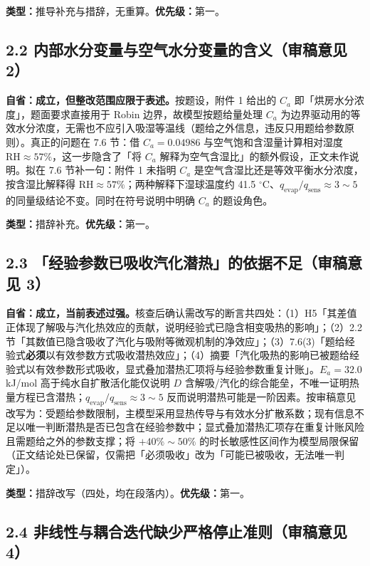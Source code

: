 \documentclass[12pt,a4paper]{ctexart}
\begin{document}
\textbf{类型：}推导补充与措辞，无重算。\textbf{优先级：}第一。

\subsection{2.2 内部水分变量与空气水分变量的含义（审稿意见 2）}

\textbf{自省：成立，但整改范围应限于表述。}按题设，附件 1 给出的 $C_a$ 即「烘房水分浓度」，题面要求直接用于 Robin 边界，故模型按题给量处理 $C_a$ 为边界驱动用的等效水分浓度，无需也不应引入吸湿等温线（题给之外信息，违反只用题给参数原则）。真正的问题在 7.6 节：借 $C_a=0.04986$ 与空气饱和含湿量计算相对湿度 $\mathrm{RH}\approx57\%$，这一步隐含了「将 $C_a$ 解释为空气含湿比」的额外假设，正文未作说明。拟在 7.6 节补一句：附件 1 未指明 $C_a$ 是空气含湿比还是等效平衡水分浓度，按含湿比解释得 $\mathrm{RH}\approx57\%$；两种解释下湿球温度约 41.5 $^\circ$C、$q_{\mathrm{evap}}/q_{\mathrm{sens}}\approx3\sim5$ 的同量级结论不变。同时在符号说明中明确 $C_a$ 的题设角色。

\textbf{类型：}措辞补充。\textbf{优先级：}第一。

\subsection{2.3 「经验参数已吸收汽化潜热」的依据不足（审稿意见 3）}

\textbf{自省：成立，当前表述过强。}核查后确认需改写的断言共四处：（1）H5「其差值正体现了解吸与汽化热效应的贡献，说明经验式已隐含相变吸热的影响」；（2）2.2 节「其数值已隐含吸收了汽化与吸附等微观机制的净效应」；（3）7.6(3)「题给经验式\textbf{必须}以有效参数方式吸收潜热效应」；（4）摘要「汽化吸热的影响已被题给经验式以有效参数形式吸收，显式叠加潜热汇项将与经验参数重复计账」。$E_a=32.0$ kJ/mol 高于纯水自扩散活化能仅说明 $D$ 含解吸/汽化的综合能垒，不唯一证明热量方程已含潜热；$q_{\mathrm{evap}}/q_{\mathrm{sens}}\approx3\sim5$ 反而说明潜热可能是一阶因素。按审稿意见改写为：受题给参数限制，主模型采用显热传导与有效水分扩散系数；现有信息不足以唯一判断潜热是否已包含在经验参数中；显式叠加潜热汇项存在重复计账风险且需题给之外的参数支撑；将 $+40\%\sim50\%$ 的时长敏感性区间作为模型局限保留（正文结论处已保留，仅需把「必须吸收」改为「可能已被吸收，无法唯一判定」）。

\textbf{类型：}措辞改写（四处，均在段落内）。\textbf{优先级：}第一。

\subsection{2.4 非线性与耦合迭代缺少严格停止准则（审稿意见 4）}
\end{document}
